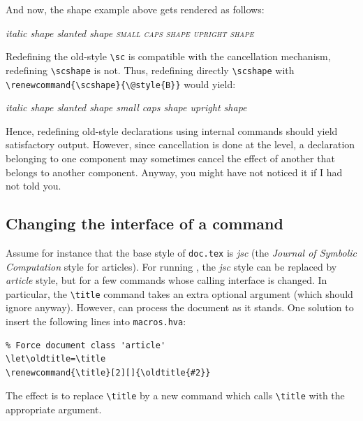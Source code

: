 \begin{htmlonly}
And now, the shape example above gets rendered as follows:
\begin{htmlout}\renewcommand{\sc}{\@style{B}}
{\itshape italic shape \slshape slanted shape
\scshape small caps shape \upshape upright shape}
\end{htmlout}

Redefining the old-style \verb+\sc+ is compatible with the cancellation
mechanism, redefining \verb+\scshape+ is not.
Thus, redefining directly \LaTeXe{} \verb+\scshape+ with
\verb+\renewcommand{\scshape}{\@style{B}}+ would yield:
\begin{htmlout}\renewcommand{\scshape}{}
{\itshape italic shape \slshape slanted shape
\scshape small caps shape \upshape upright shape}
\end{htmlout}
\end{htmlonly}

Hence, redefining old-style declarations using internal commands
should yield satisfactory output.
However, since cancellation is done at the \html{}
level, a declaration belonging to one component may sometimes cancel the
effect of another that belongs to another component.
Anyway, you might have not noticed it if I had not told you.

\subsection{Changing the interface of a command}\label{customize-let}
Assume for instance that the base style of \texttt{doc.tex} is
\textit{jsc} (the
\emph{Journal of Symbolic Computation} style for articles).
For running \hevea{}, the \textit{jsc} style can be replaced by
\textit{article}
style, but for a few commands whose calling interface is changed.
In particular, the \verb+\title+ command
takes an extra optional argument (which \hevea{} should ignore
anyway).
However, \hevea{} can process the document as it stands.
One  solution to insert the following lines into \texttt{macros.hva}:
\begin{verbatim}
% Force document class 'article'
\let\oldtitle=\title
\renewcommand{\title}[2][]{\oldtitle{#2}}
\end{verbatim}
The effect is to replace \verb+\title+ by a new command which
calls \hevea{} \verb+\title+ with the appropriate argument.
